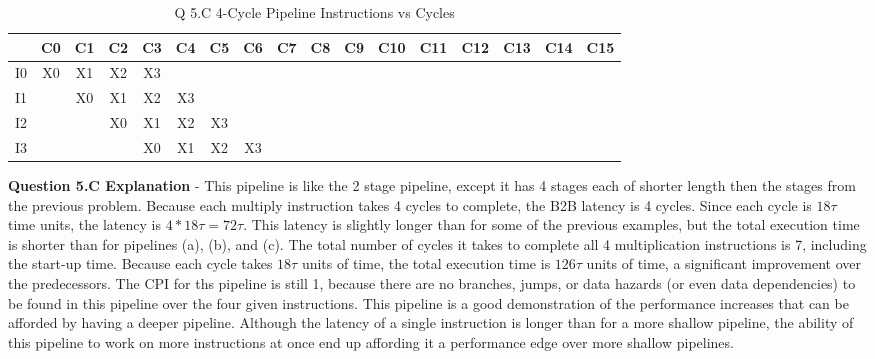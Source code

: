 \documentclass[a4paper,11pt]{article}
\begin{document}
\begin{table}[H]
\caption{Q 5.C 4-Cycle Pipeline Instructions vs Cycles}
\begin{center}
\begin{tabular}{|c|c|c|c|c|c|c|c|c|c|c|c|c|c|c|c|c|} \hline
     & C0 & C1 & C2 & C3 & C4 & C5 & C6 & C7 & C8 & C9 & C10 & C11 & C12 & C13 & C14 & C15  \\ \hline
  I0 & X0 & X1 & X2 & X3 &    &    &    &    &    &     &     &     &     &     &    &      \\ \hline   
  I1 &    & X0 & X1 & X2 & X3 &    &    &    &    &     &     &     &     &     &    &      \\ \hline   
  I2 &    &    & X0 & X1 & X2 & X3 &    &    &    &     &     &     &     &     &    &      \\ \hline   
  I3 &    &    &    & X0 & X1 & X2 & X3 &    &    &     &     &     &     &     &    &      \\ \hline   
\end{tabular}
\end{center}
\end{table}

\item \textbf{Question 5.C Explanation} - This pipeline is like the 2 stage pipeline, except it has 4 stages each of shorter length then the stages from the previous problem. Because each multiply instruction takes 4 cycles to complete, the B2B latency is 4 cycles. Since each cycle is $18\tau$ time units, the latency is $4*18\tau = 72\tau$. This latency is slightly longer than for some of the previous examples, but the total execution time is shorter than for pipelines (a), (b), and (c). The total number of cycles it takes to complete all 4 multiplication instructions is 7, including the start-up time. Because each cycle takes $18\tau$ units of time, the total execution time is $126\tau$ units of time, a significant improvement over the predecessors. The CPI for ths pipeline is still 1, because there are no branches, jumps, or data hazards (or even data dependencies) to be found in this pipeline over the four given instructions. This pipeline is a good demonstration of the performance increases that can be afforded by having a deeper pipeline. Although the latency of a single instruction is longer than for a more shallow pipeline, the ability of this pipeline to work on more instructions at once end up affording it a performance edge over more shallow pipelines. 
  
\end{document}
